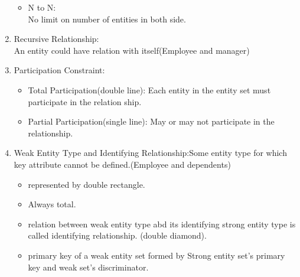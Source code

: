 \begin{enumerate}
\begin{itemize}
        \item N to N: \\No limit on number of entities in both side.
    \end{itemize}
    \item Recursive Relationship:\\ An entity could have relation with itself(Employee and manager)
    \item Participation Constraint:
    \begin{itemize}
        \item Total Participation(double line): Each entity in the entity set must participate in the relation ship.
        \item Partial Participation(single line): May or may not participate in the relationship.
    \end{itemize}
    \item Weak Entity Type and Identifying Relationship:Some entity type for which key attribute cannot be defined.(Employee and dependents)
    \begin{itemize}
        \item represented by double rectangle.
        \item Always total.
        \item relation between weak entity type abd its identifying strong entity type is called identifying relationship. (double diamond).
        \item primary key of a weak entity set formed by Strong entity set's primary key and weak set's discriminator.
    \end{itemize}
\end{enumerate}
